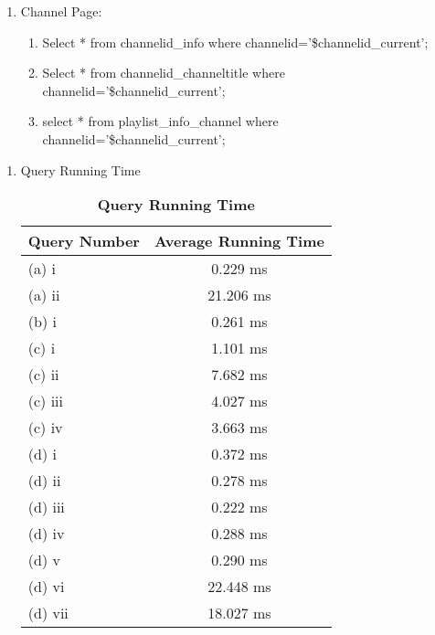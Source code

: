 \documentclass[10pt]{article}
\begin{document}
\begin{enumerate}
\begin{enumerate}
			\begin{enumerate}
				\item Select * from channelid\_info where subscribercount\textgreater1000 AND videocount\textgreater1000 AND viewcount\textgreater10000 AND commentcount\textgreater2000 AND country=’US’ ORDER BY subscribercount
				\item Select * from channelid\_info where viewcount\textless9090 AND commentcount\textgreater4200 ORDER BY videocount DESC
			\end{enumerate}
			\item Channel Page:
			\begin{enumerate}
				\item Select * from channelid\_info where channelid=’\$channelid\_current’;
				\item Select * from channelid\_channeltitle where channelid=’\$channelid\_current’;
				\item select * from playlist\_info\_channel where channelid=’\$channelid\_current’;
			\end{enumerate}
		\end{enumerate}
		\begin{enumerate}
			\item Query Running Time
			\begin{table}[]
				\centering
				\caption{\textbf{Query Running Time}}
				\label{my-label}
				\begin{tabular}{|l|c|}
					\hline
					\textbf{Query Number} & \textbf{Average Running Time} \\ \hline
					(a) i & 0.229 ms \\ \hline
					(a) ii & 21.206 ms \\ \hline
					(b) i & 0.261 ms \\ \hline
					(c) i & 1.101 ms \\ \hline
					(c) ii & 7.682 ms \\ \hline
					(c) iii & 4.027 ms \\ \hline
					(c) iv & 3.663 ms \\ \hline
					(d) i & 0.372 ms \\ \hline
					(d) ii & 0.278 ms \\ \hline
					(d) iii & 0.222 ms \\ \hline
					(d) iv & 0.288 ms \\ \hline
					(d) v & 0.290 ms \\ \hline
					(d) vi & 22.448 ms \\ \hline
					(d) vii & 18.027 ms \\ \hline

\end{tabular}
\end{table}
\end{enumerate}
\end{enumerate}
\end{document}

